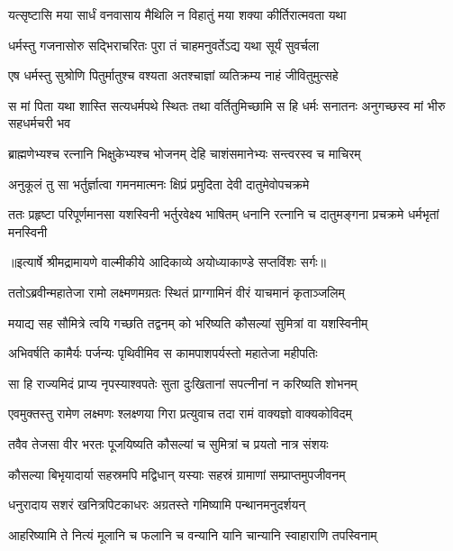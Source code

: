\twolineshloka
{यत्सृष्टासि मया सार्धं वनवासाय मैथिलि}
{न विहातुं मया शक्या कीर्तिरात्मवता यथा} %

\twolineshloka
{धर्मस्तु गजनासोरु सद्भिराचरितः पुरा}
{तं चाहमनुवर्तेऽद्य यथा सूर्यं सुवर्चला} %

\twolineshloka
{एष धर्मस्तु सुश्रोणि पितुर्मातुश्च वश्यता}
{अतश्चाज्ञां व्यतिक्रम्य नाहं जीवितुमुत्सहे} %

\threelineshloka
{स मां पिता यथा शास्ति सत्यधर्मपथे स्थितः}
{तथा वर्तितुमिच्छामि स हि धर्मः सनातनः}
{अनुगच्छस्व मां भीरु सहधर्मचरी भव} %

\twolineshloka
{ब्राह्मणेभ्यश्च रत्नानि भिक्षुकेभ्यश्च भोजनम्}
{देहि चाशंसमानेभ्यः सन्त्वरस्व च माचिरम्} %

\twolineshloka
{अनुकूलं तु सा भर्तुर्ज्ञात्वा गमनमात्मनः}
{क्षिप्रं प्रमुदिता देवी दातुमेवोपचक्रमे} %

\fourlineindentedshloka
{ततः प्रहृष्टा परिपूर्णमानसा}
{यशस्विनी भर्तुरवेक्ष्य भाषितम्}
{धनानि रत्नानि च दातुमङ्गना}
{प्रचक्रमे धर्मभृतां मनस्विनी} %


{॥इत्यार्षे श्रीमद्रामायणे वाल्मीकीये आदिकाव्ये अयोध्याकाण्डे सप्तविंशः सर्गः॥}


\twolineshloka
{ततोऽब्रवीन्महातेजा रामो लक्ष्मणमग्रतः}
{स्थितं प्राग्गामिनं वीरं याचमानं कृताञ्जलिम्} %

\twolineshloka
{मयाद्य सह सौमित्रे त्वयि गच्छति तद्वनम्}
{को भरिष्यति कौसल्यां सुमित्रां वा यशस्विनीम्} %

\twolineshloka
{अभिवर्षति कामैर्यः पर्जन्यः पृथिवीमिव}
{स कामपाशपर्यस्तो महातेजा महीपतिः} %

\twolineshloka
{सा हि राज्यमिदं प्राप्य नृपस्याश्वपतेः सुता}
{दुःखितानां सपत्नीनां न करिष्यति शोभनम्} %

\twolineshloka
{एवमुक्तस्तु रामेण लक्ष्मणः श्लक्ष्णया गिरा}
{प्रत्युवाच तदा रामं वाक्यज्ञो वाक्यकोविदम्} %

\twolineshloka
{तवैव तेजसा वीर भरतः पूजयिष्यति}
{कौसल्यां च सुमित्रां च प्रयतो नात्र संशयः} %

\twolineshloka
{कौसल्या बिभृयादार्या सहस्रमपि मद्विधान्}
{यस्याः सहस्रं ग्रामाणां सम्प्राप्तमुपजीवनम्} %

\twolineshloka
{धनुरादाय सशरं खनित्रपिटकाधरः}
{अग्रतस्ते गमिष्यामि पन्थानमनुदर्शयन्} %

\twolineshloka
{आहरिष्यामि ते नित्यं मूलानि च फलानि च}
{वन्यानि यानि चान्यानि स्वाहाराणि तपस्विनाम्} %

